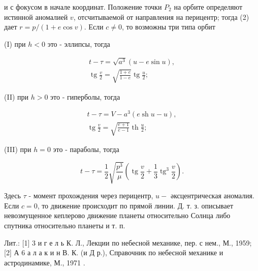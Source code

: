 \documentclass[10pt]{article}
\begin{document}
и с фокусом в начале координат. Положение точки $P_{2}$ на орбите определяют истинной аномалией $v$, отсчитываемой от направления на перицентр; тогда (2) дает $r=p /(1+e \cos v)$. Если $c \neq 0$, то возможны три типа орбит



(I) при $h<0$ это - эллипсы, тогда



\[

\begin{gathered}

t-\tau=\sqrt{a^{3}}(u-e \sin u), \\

\operatorname{tg} \frac{v}{2}=\sqrt{\frac{1+e}{1-e}} \operatorname{tg} \frac{u}{2} ;

\end{gathered}

\]



(II) при $h>0$ это - гиперболы, тогда



\[

\begin{gathered}

t-\tau=V-a^{3}(e \operatorname{sh} u-u), \\

\operatorname{tg} \frac{v}{2}=\sqrt{\frac{e+1}{e-1}} \operatorname{th} \frac{u}{2} ;

\end{gathered}

\]



(III) при $h=0$ это - параболы, тогда



\[

t-\tau=\frac{1}{2} \sqrt{\frac{p^{3}}{\mu}}\left(\operatorname{tg} \frac{v}{2}+\frac{1}{3} \operatorname{tg}^{3} \frac{v}{2}\right) .

\]



Здесь $\tau$ - момент прохождения через перицентр, $u-$ әксцентрическая аномалия. Если $c=0$, то движение происходит по прямой линии. Д. т. з. описывает невозмущенное кеплерово движение планеты относительно Солнца либо спутника относительно планеты и т. п.



Лит.: [1] 3 и г е л ь К. Л., Лекции по небесной механике, пер. с нем., М., 1959; [2] А 6 а л а к и н В. К. (и Д р.), Справочник по небесной механике и астродинамике, М., 1971 .
\end{document}
